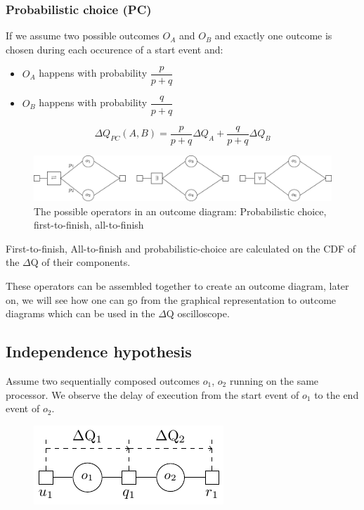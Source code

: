     \subsubsection{Probabilistic choice (PC)}
        If we assume two possible outcomes $O_A$ and $O_B$ and exactly one outcome is chosen during each occurence of a start event and:
        \begin{itemize}
            \item $O_A$ happens with probability $\dfrac{p}{p+q}$
            \item $O_B$ happens with probability $\dfrac{q}{p + q}$
        \end{itemize}
        \begin{equation}
           \Delta Q_{PC}(A, B) = \dfrac{p}{p + q}\Delta Q_A + \dfrac{q}{p + q}\Delta Q_B 
            \label{eq:pc}
        \end{equation} 

    \begin{figure}[H]
        \begin{center}
            \includegraphics[width = \textwidth]{tikz/op.pdf}
        \end{center}
        \caption{The possible operators in an outcome diagram: Probabilistic choice, first-to-finish, all-to-finish}
        \label{fig:op}
    \end{figure}
    First-to-finish, All-to-finish and probabilistic-choice are calculated on the CDF of the $\Delta$Q of their components.
    
    These operators can be assembled together to create an outcome diagram, later on, we will see how one can go from the graphical representation to outcome diagrams which can be used in the $\Delta$Q oscilloscope.
    
    \subsection{Independence hypothesis}    
        Assume two sequentially composed outcomes $o_1$, $o_2$ running on the same processor. We observe the delay of execution from the start event of $o_1$ to the end event of $o_2$. 
        \begin{figure}[H]
            \begin{center}
                \includegraphics[scale=1]{tikz/indep.pdf}
            \end{center}
        \end{figure}
        
